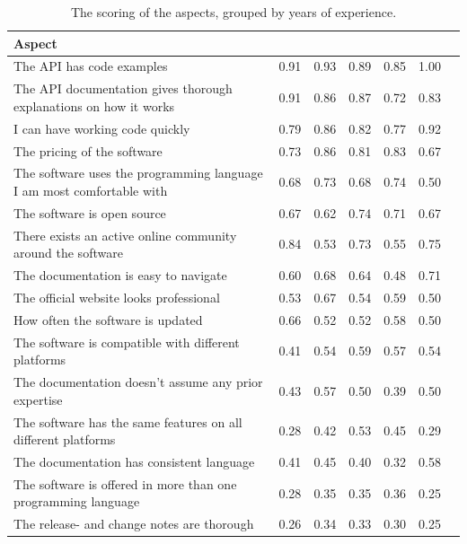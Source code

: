 \documentclass{cslthse-msc}
\begin{document}
    \begin{table}[H]
        \centering
        \caption{The scoring of the aspects, grouped by years of experience.}
        \label{tab:jobExp}
        \begin{tabularx}{\columnwidth}{X|c|c|c|c|c|c}
            \textbf{Aspect}	&\textbf{\rotatebox{90}{	$<5$ years	}}&\textbf{\rotatebox{90}{	$5-10$ years	}}&\textbf{\rotatebox{90}{	$10-15$ years	}}&\textbf{\rotatebox{90}{	$15-25$ years	}}&\textbf{\rotatebox{90}{	$25+$ years}}	\\ \hline
            The API has code examples	&	0.91	&	0.93	&	0.89	&	0.85	&	1.00	\\ \hline
            The API documentation gives thorough explanations on how it works	&	0.91	&	0.86	&	0.87	&	0.72	&	0.83	\\ \hline
            I can have working code quickly	&	0.79	&	0.86	&	0.82	&	0.77	&	0.92	\\ \hline
            The pricing of the software	&	0.73	&	0.86	&	0.81	&	0.83	&	0.67	\\ \hline
            The software uses the programming language I am most comfortable with	&	0.68	&	0.73	&	0.68	&	0.74	&	0.50	\\ \hline
            The software is open source	&	0.67	&	0.62	&	0.74	&	0.71	&	0.67	\\ \hline
            There exists an active online community around the software	&	0.84	&	0.53	&	0.73	&	0.55	&	0.75	\\ \hline
            The documentation is easy to navigate	&	0.60	&	0.68	&	0.64	&	0.48	&	0.71	\\ \hline
            The official website looks professional	&	0.53	&	0.67	&	0.54	&	0.59	&	0.50	\\ \hline
            How often the software is updated	&	0.66	&	0.52	&	0.52	&	0.58	&	0.50	\\ \hline
            The software is compatible with different platforms	&	0.41	&	0.54	&	0.59	&	0.57	&	0.54	\\ \hline
            The documentation doesn't assume any prior expertise	&	0.43	&	0.57	&	0.50	&	0.39	&	0.50	\\ \hline
            The software has the same features on all different platforms	&	0.28	&	0.42	&	0.53	&	0.45	&	0.29	\\ \hline
            The documentation has consistent language	&	0.41	&	0.45	&	0.40	&	0.32	&	0.58	\\ \hline
            The software is offered in more than one programming language	&	0.28	&	0.35	&	0.35	&	0.36	&	0.25	\\ \hline
            The release- and change notes are thorough	&	0.26	&	0.34	&	0.33	&	0.30	&	0.25	\\ \hline
        \end{tabularx}
    \end{table}
\end{document}
